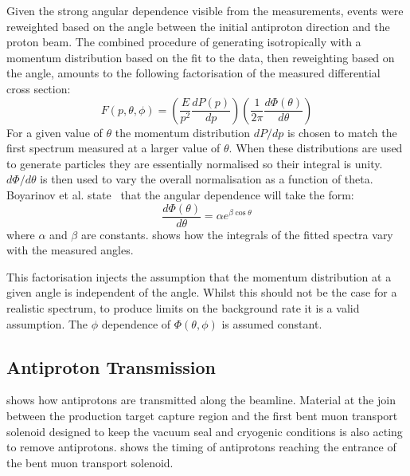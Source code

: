 Given the strong angular dependence visible from the measurements, events were reweighted based on the angle between the initial antiproton direction and the proton beam.
The combined procedure of generating isotropically with a momentum distribution based on the fit to the data, then reweighting based on the angle, amounts to the following factorisation of the measured differential cross section:
\begin{equation}
	F(p,\theta,\phi)=\left(\frac{E}{p^2}\frac{dP(p)}{dp}\right)\left(\frac{1}{2\pi}\frac{d\Phi(\theta)}{d\theta}\right)
\end{equation}
For a given value of $\theta$ the momentum distribution $dP/dp$ is chosen to match the first spectrum measured at a larger value of $\theta$.
When these distributions are used to generate particles they are essentially normalised so their integral is unity.
$d\Phi/d\theta$ is then used to vary the overall normalisation as a function of theta.
Boyarinov et al. state~\cite{Boyarinov:1994tp} that the angular dependence will take the form:
\begin{equation}
\frac{d\Phi(\theta)}{d\theta}=\alpha e^{\beta\cos\theta}
\end{equation}
where $\alpha$ and $\beta$ are constants.
 shows how the integrals of the fitted spectra vary with the measured angles.  

This factorisation injects the assumption that the momentum distribution at a given angle is independent of the angle.
Whilst this should not be the case for a realistic spectrum, to produce limits on the background rate it is a valid assumption.
The $\phi$ dependence of $\Phi(\theta,\phi)$ is assumed constant.  

\subsection{Antiproton Transmission}
 shows how antiprotons are transmitted along the beamline.
Material at the join between the production target capture region and the first bent muon transport solenoid designed to keep the vacuum seal and cryogenic conditions is also acting to remove antiprotons.
 shows the timing of antiprotons reaching the entrance of the bent muon transport solenoid.

